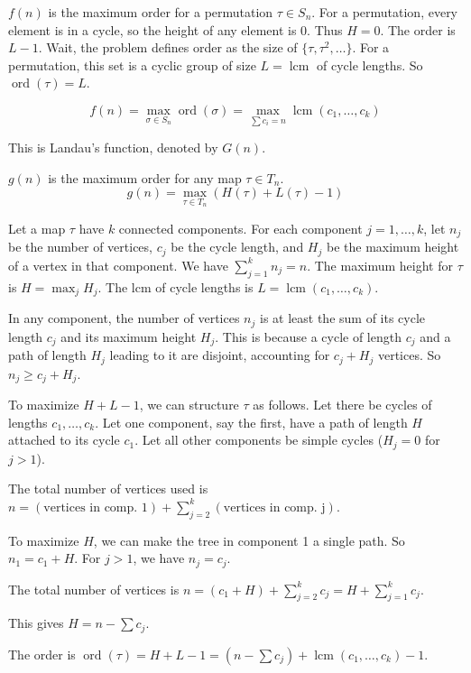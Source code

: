 \documentclass[12pt,a4paper]{article}
\theoremstyle{definition}
\begin{document}
        $f(n)$ is the maximum order for a permutation $\tau \in S_n$. For a permutation, every element is in a cycle, so the height of any element is 0. Thus $H=0$. The order is $L-1$. Wait, the problem defines order as the size of $\{\tau, \tau^2, \dots\}$. For a permutation, this set is a cyclic group of size $L = \operatorname{lcm}$ of cycle lengths. So $\operatorname{ord}(\tau)=L$.

        $$f(n) = \max_{\sigma \in S_n} \operatorname{ord}(\sigma) = \max_{\sum c_i=n} \operatorname{lcm}(c_1, \dots, c_k)$$

        This is Landau's function, denoted by $G(n)$.

        $g(n)$ is the maximum order for any map $\tau \in T_n$.
        $$g(n) = \max_{\tau \in T_n} (H(\tau)+L(\tau)-1)$$

        Let a map $\tau$ have $k$ connected components. For each component $j=1,\dots,k$, let $n_j$ be the number of vertices, $c_j$ be the cycle length, and $H_j$ be the maximum height of a vertex in that component. We have $\sum_{j=1}^k n_j = n$. The maximum height for $\tau$ is $H = \max_j H_j$. The lcm of cycle lengths is $L = \operatorname{lcm}(c_1, \dots, c_k)$.

        In any component, the number of vertices $n_j$ is at least the sum of its cycle length $c_j$ and its maximum height $H_j$. This is because a cycle of length $c_j$ and a path of length $H_j$ leading to it are disjoint, accounting for $c_j+H_j$ vertices. So $n_j \geq c_j+H_j$.

        To maximize $H+L-1$, we can structure $\tau$ as follows. Let there be cycles of lengths $c_1, \dots, c_k$. Let one component, say the first, have a path of length $H$ attached to its cycle $c_1$. Let all other components be simple cycles ($H_j=0$ for $j>1$).

        The total number of vertices used is $n = (\text{vertices in comp. 1}) + \sum_{j=2}^k (\text{vertices in comp. j})$.

        To maximize $H$, we can make the tree in component 1 a single path. So $n_1 = c_1+H$. For $j>1$, we have $n_j = c_j$.

        The total number of vertices is $n = (c_1+H) + \sum_{j=2}^k c_j = H + \sum_{j=1}^k c_j$.

        This gives $H = n - \sum c_j$.

        The order is $\operatorname{ord}(\tau) = H+L-1 = (n-\sum c_j) + \operatorname{lcm}(c_1,\dots,c_k) - 1$.
\end{document}
